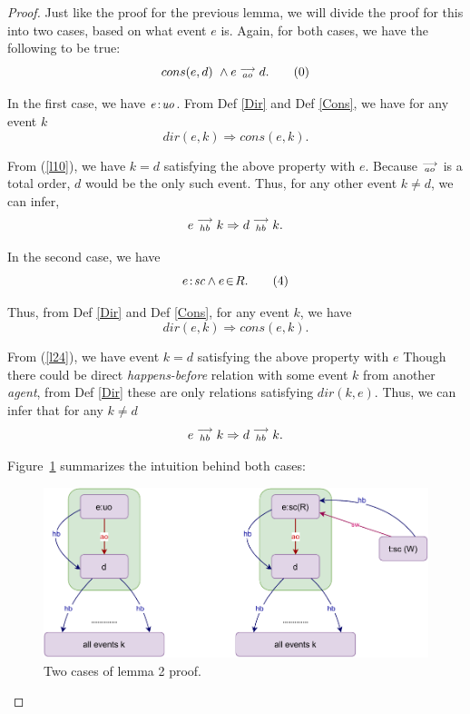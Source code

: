 \begin{proof}
    
    Just like the proof for the previous lemma, we will divide the proof for this into two cases, based on what event $e$ is. Again, for both cases, we have the following to be true: 
    \[
        cons(e,d) \ \wedge e\stackrel{\longrightarrow}{_{ao}}d.
        \tag{0}
        \label{l20}
    \]

   In the first case, we have $e\!:\!\textit{uo}$. From Def \ref{Dir} and Def \ref{Cons}, we have for any event $k$
   \[
        dir(e,k) \Rightarrow cons(e,k).
   \]
   
   From (\ref{l10}), we have $k=d$ satisfying the above property with $e$. 
   Because $\stackrel{\longrightarrow}{_{ao}}$ is a total order, $d$ would be the only such event. 
   Thus, for any other event $k \neq d$, we can infer,  
   \[
        e\stackrel{\longrightarrow}{_{hb}}k \Rightarrow d\stackrel{\longrightarrow}{_{hb}}k.
   \]
   
    In the second case, we have 
    \[
        e\!:\!\textit{sc} \wedge e\!\in\!R.
        \tag{4}
        \label{l24}
    \]
    
    Thus, from Def \ref{Dir} and Def \ref{Cons}, for any event $k$, we have 
    \[
        dir(e,k) \Rightarrow cons(e,k).
    \]
    
    From (\ref{l24}), we have event $k=d$ satisfying the above property with $e$  
    Though there could be direct \textit{happens-before} relation with some event $k$ from another \textit{agent}, from Def \ref{Dir} these are only relations satisfying $dir(k,e)$. Thus, we can infer that for any $k \neq d$ 
    \[
        e\stackrel{\longrightarrow}{_{hb}}k \Rightarrow d\stackrel{\longrightarrow}{_{hb}}k.
    \]
    
    Figure~\ref{lemma:second} summarizes the intuition behind both cases: 
    \begin{figure}[H]
        \centering
        \includegraphics[scale=0.7]{5.InstructionReordering/3.Lemmas/Lemma2.pdf}
        \caption{Two cases of lemma 2 proof.}
        \label{lemma:second}
    \end{figure}

\end{proof}

